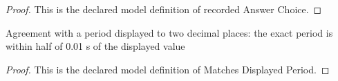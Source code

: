 \begin{proof}
  This is the declared model definition of recorded Answer Choice.
\end{proof}
\begin{definition}
  \label{def:physics:phyx-mini-0267:phyxminiproblems-problemphyxmini0267-matchesdisplayedperiod}
  Agreement with a period displayed to two decimal places: the exact period is within half of 0.01 s of the displayed value
\end{definition}
\begin{proof}
  This is the declared model definition of Matches Displayed Period.
\end{proof}
